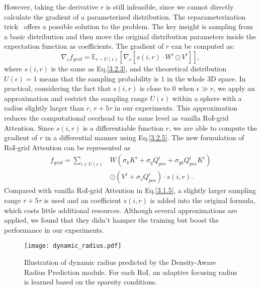 \documentclass[10pt,twocolumn,letterpaper]{article}
\begin{document}
However, taking the derivative \wrt $r$ is still infeasible, since we cannot directly calculate the gradient of a parameterized distribution. The reparameterization trick~\cite{kingma2013auto} offers a possible solution to the problem. The key insight is sampling from a basic distribution and then move the original distribution parameters inside the expectation function as coefficients. The gradient of $r$ can be computed as:
\begin{equation} \label{3.2.5}
    \nabla_{r} f_{grid} = \mathbb{E}_{i \sim U(\epsilon)}[\nabla_{r} [s(i, r) \cdot W^{i} \odot V^{i}]],
\end{equation}
where $s(i, r)$ is the same as Eq.\ref{3.2.3}, and the theoretical distribution $U(\epsilon)=1$ means that the sampling probability is $1$ in the whole 3D space. In practical, considering the fact that $s(i, r)$ is close to $0$ when $\epsilon \gg r$, we apply an approximation and restrict the sampling range $U(\epsilon)$ within a sphere with a radius slightly larger than $r$, \ie $r+5\tau$ in our experiments. This approximation reduces the computational overhead to the same level as vanilla RoI-grid Attention. Since $s(i, r)$ is a differentiable function \wrt $r$, we are able to compute the gradient of $r$ in a differential manner using Eq.\ref{3.2.5}. The new formulation of RoI-grid Attention can be represented as \begin{equation} \label{3.2.6}
\begin{aligned}
f_{grid} = \sum_{i \in U(\epsilon)} & W(\sigma_{k} K^{i} + \sigma_{q} Q^{i}_{pos} + \sigma_{qk} Q^{i}_{pos}K^{i})\\& \odot (V^{i} + \sigma_{v} Q^{i}_{pos}) \cdot s(i, r).
\end{aligned}
\end{equation}
Compared with vanilla RoI-grid Attention in Eq.\ref{3.1.5}, a slightly larger sampling range $r + 5\tau$ is used and an coefficient $s(i, r)$ is added into the original formula, which costs little additional resources. Although several approximations are applied, we found that they didn't hamper the training but boost the performance in our experiments. 

\begin{figure}[!t]
\centering
\texttt{[image: dynamic\_radius.pdf]}
\caption{Illustration of dynamic radius predicted by the Density-Aware Radius Prediction module. For each RoI, an adaptive focusing radius is learned based on the sparsity conditions.}
\label{fig_radius}
\vspace{-4mm}
\end{figure}
\end{document}
